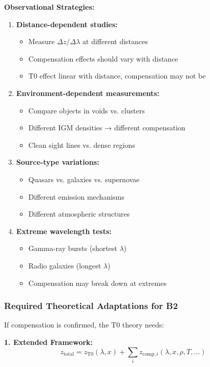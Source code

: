 \documentclass[12pt,a4paper]{article}
\theoremstyle{definition}
\begin{document}
	\textbf{Observational Strategies:}
	\begin{enumerate}
		\item \textbf{Distance-dependent studies:}
		\begin{itemize}
			\item Measure $\Delta z/\Delta\lambda$ at different distances
			\item Compensation effects should vary with distance
			\item T0 effect linear with distance, compensation may not be
		\end{itemize}
		
		\item \textbf{Environment-dependent measurements:}
		\begin{itemize}
			\item Compare objects in voids vs. clusters
			\item Different IGM densities → different compensation
			\item Clean sight lines vs. dense regions
		\end{itemize}
		
		\item \textbf{Source-type variations:}
		\begin{itemize}
			\item Quasars vs. galaxies vs. supernovae
			\item Different emission mechanisms
			\item Different atmospheric structures
		\end{itemize}
		
		\item \textbf{Extreme wavelength tests:}
		\begin{itemize}
			\item Gamma-ray bursts (shortest $\lambda$)
			\item Radio galaxies (longest $\lambda$)
			\item Compensation may break down at extremes
		\end{itemize}
	\end{enumerate}
	
	\subsubsection{Required Theoretical Adaptations for B2}
	
	If compensation is confirmed, the T0 theory needs:
	
	\textbf{1. Extended Framework:}
	\begin{equation}
		z_{\text{total}} = z_{\text{T0}}(\lambda, x) + \sum_i z_{\text{comp},i}(\lambda, x, \rho, T, ...)
	\end{equation}
	
\end{document}
